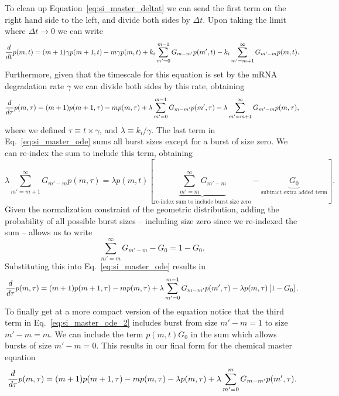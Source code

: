 To clean up Equation~\ref{eq:si_master_deltat} we can send the first term on the
right hand side to the left, and divide both sides by $\Delta t$. Upon taking
the limit where $\Delta t \rightarrow 0$ we can write
\begin{equation}
{d \over dt}p(m, t) = (m + 1) \gamma p(m + 1, t)
- m \gamma p(m, t)
+ k_i \sum_{m'=0}^{m-1} G_{m-m'} p(m', t) 
- k_i \sum_{m'=m + 1}^{\infty} G_{m'-m} p(m, t).
\end{equation}
Furthermore, given that the timescale for this equation is set by the mRNA
degradation rate $\gamma$ we can divide both sides by this rate, obtaining
\begin{equation}
{d \over d\tau}p(m, \tau) = (m + 1) p(m + 1, \tau)
- m p(m, \tau)
+ \lambda \sum_{m'=0}^{m-1} G_{m-m'} p(m', \tau) 
- \lambda \sum_{m'=m + 1}^{\infty} G_{m'-m} p(m, \tau),
\label{eq:si_master_ode}
\end{equation}
where we defined $\tau \equiv t \times \gamma$, and $\lambda \equiv k_i/\gamma$.
The last term in Eq.~\ref{eq:si_master_ode} sums all burst sizes except for a 
burst of size zero. We can re-index the sum to include this term, obtaining
\begin{equation}
\lambda \sum_{m'=m + 1}^{\infty} G_{m'-m} p(m, \tau) = \lambda p(m, t) \left[
\underbrace{\sum_{m'={m}}^{\infty}G_{m'-m}}
_{\text{re-index sum to include burst size zero}} -
\underbrace{G_0}_{\text{subtract extra added term}}\right].
\end{equation}
Given the normalization constraint of the geometric distribution, adding the
probability of all possible burst sizes -- including size zero since we
re-indexed the sum -- allows us to write
\begin{equation}
\sum_{m'=m}^{\infty}G_{m'-m} - G_0 = 1 - G_0.
\end{equation}
Substituting this into Eq.~\ref{eq:si_master_ode} results in
\begin{equation}
{d \over d\tau}p(m, \tau) = (m + 1) p(m + 1, \tau)
- m p(m, \tau)
+ \lambda \sum_{m'=0}^{m-1} G_{m-m'} p(m', \tau) 
- \lambda p(m, \tau) \left[ 1 - G_0 \right].
\label{eq:si_master_ode_2}
\end{equation}
To finally get at a more compact version of the equation notice that the third
term in Eq.~\ref{eq:si_master_ode_2} includes burst from size $m'-m = 1$ to size
$m' - m = m$. We can include the term $p(m, t) G_0$ in the sum which allows
bursts of size $m' - m = 0$. This results in our final form for the chemical
master equation
\begin{align}
{d \over d\tau}p(m, \tau) = 
(m + 1) p(m+1, \tau)
- m p(m, \tau) - 
\lambda p(m, \tau)
+ \lambda \sum_{m^\prime=0}^m G_{m-m^\prime} p(m^\prime, \tau).
\label{eq:si_master_unreg}
\end{align}

